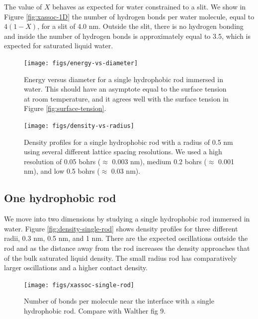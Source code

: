 \documentclass[letterpaper,twocolumn,amsmath,amssymb,prb]{revtex4-1}
\begin{document}
The value of $X$ behaves as expected for water constrained to a slit. We
show in Figure \ref{fig:xassoc-1D} the number of hydrogen bonds per water 
molecule, equal to $4(1-X)$, for a slit of 4.0 nm.
Outside the slit, there is no hydrogen bonding and inside the number of hydrogen
bonds is approximately equal to 3.5, which is expected for saturated liquid
water.

\begin{figure}
\begin{center}
\texttt{[image: figs/energy-vs-diameter]}
\end{center}
\caption{ Energy versus diameter for a single hydrophobic rod
immersed in water. This should have an asymptote equal to the surface
tension at room temperature, and it agrees well with the surface tension in
Figure \ref{fig:surface-tension}. }
\label{fig:energy-vs-diameter}
\end{figure}

\begin{figure}
\begin{center}
\texttt{[image: figs/density-vs-radius]}
\end{center}
\caption{ Density profiles for 
a single hydrophobic rod with a radius of 0.5 nm using several different 
lattice spacing resolutions. We used a high resolution of 0.05 bohrs ($\approx$
0.003 nm), 
medium 0.2 bohrs ($\approx$ 0.001 nm), and low 0.5 bohrs ($\approx$ 0.03 nm).}
\label{fig:densityresolution}
\end{figure}

\subsection{One hydrophobic rod}
We move into two dimensions by studying a single hydrophobic rod
immersed in water. Figure \ref{fig:density-single-rod} shows density
profiles for three different radii, 0.3 nm, 0.5 nm, and 1 nm. There are the
expected oscillations outside the rod and as the distance away from the rod
increases
the density approaches that of the bulk saturated liquid density. The small
radius
rod has comparatively larger oscillations and a higher contact density.

\begin{figure}
\begin{center}
\texttt{[image: figs/xassoc-single-rod]}
\end{center}
\caption{ Number of bonds per molecule near the interface with a single
hydrophobic rod. Compare with Walther\cite{walther2001carbon} fig 9. }
\label{fig:xassoc-single-rod}
\end{figure}
\end{document}
